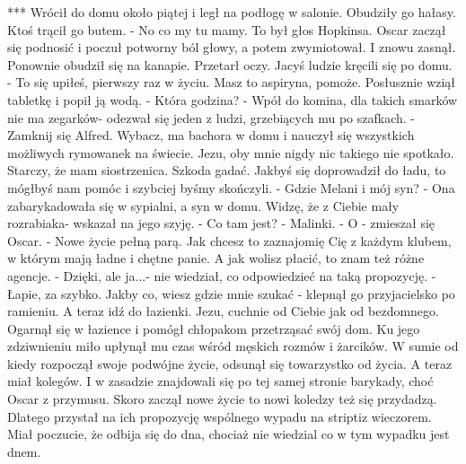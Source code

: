 \documentclass[12pt,a4paper]{book}
\begin{document}
                         ***
Wrócił do domu około piątej i legł na podłogę w salonie.  Obudziły go hałasy. Ktoś trącił go butem.
- No co my tu mamy. 
To był głos Hopkinsa. 
Oscar zaczął się podnosić i poczuł potworny ból głowy, a  potem zwymiotował. I znowu zasnął. Ponownie obudził się na kanapie. Przetarł oczy. Jacyś ludzie kręcili się po domu. 
- To się upiłeś, pierwszy raz w życiu. Masz to aspiryna, pomoże.
Posłusznie wziął tabletkę i popił ją wodą. 
- Która godzina?
- Wpół do komina, dla takich smarków nie ma zegarków- odezwał się jeden z ludzi, grzebiących mu po szafkach.
- Zamknij się Alfred. Wybacz, ma bachora w domu i nauczył się wszystkich możliwych rymowanek na świecie. Jezu, oby mnie nigdy nic takiego nie spotkało. Starczy, że mam siostrzenica. Szkoda gadać. Jakbyś się doprowadził do ładu, to mógłbyś nam pomóc i szybciej byśmy skończyli. 
- Gdzie Melani i mój syn?
- Ona zabarykadowała się w sypialni, a syn w domu. Widzę, że z Ciebie mały rozrabiaka- wskazał na jego szyję.
- Co tam jest?
- Malinki. 
- O - zmieszał się Oscar. 
- Nowe życie pełną parą. Jak chcesz to zaznajomię Cię z każdym klubem, w którym mają ładne i chętne panie. A jak wolisz płacić, to znam też różne agencje. 
- Dzięki, ale ja...- nie wiedział, co odpowiedzieć na taką propozycję. 
- Łapie, za szybko. Jakby co, wiesz gdzie mnie szukać - klepnął go przyjacielsko po ramieniu. A teraz idź do łazienki. Jezu, cuchnie od Ciebie jak od bezdomnego. 
Ogarnął się w łazience i pomógł chłopakom przetrząsać swój dom. Ku jego zdziwnieniu miło upłynął mu czas wśród męskich rozmów i żarcików. W sumie od kiedy rozpoczął swoje podwójne życie, odsunął się towarzystko od życia. A teraz miał kolegów. I w zasadzie znajdowali się po tej samej stronie barykady, choć Oscar z przymusu. Skoro zaczął nowe życie to nowi koledzy też się przydadzą. Dlatego przystał na ich propozycję wspólnego wypadu na striptiz wieczorem. Miał poczucie, że odbija się do dna, chociaż nie wiedzial co w tym wypadku jest dnem. 
\end{document}
